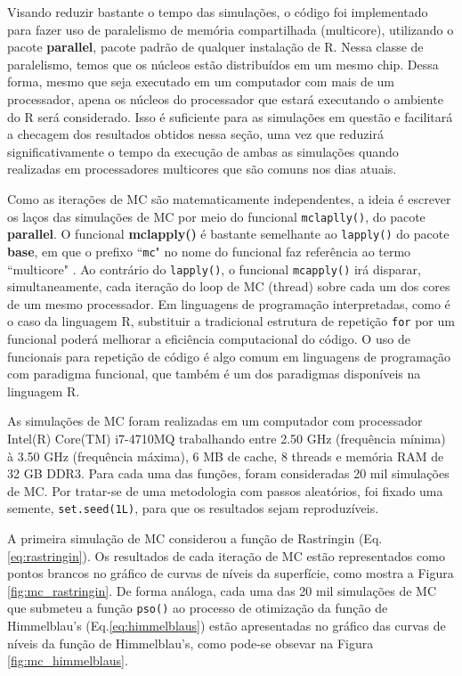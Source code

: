 \documentclass[10pt,letterpaper]{article}
\begin{document}
Visando reduzir bastante o tempo das simulações, o código foi implementado para fazer uso de paralelismo de memória compartilhada (multicore), utilizando o pacote \textbf{parallel}, pacote padrão de qualquer instalação de \textsc{R}. Nessa classe de paralelismo, temos que os núcleos estão distribuídos em um mesmo chip. Dessa forma, mesmo que seja executado em um computador com mais de um processador, apena os núcleos do processador que estará executando o ambiente do \textsc{R} será considerado. Isso é suficiente para as simulações em questão e facilitará a checagem dos resultados obtidos nessa seção, uma vez que reduzirá significativamente o tempo da execução de ambas as simulações quando realizadas em processadores multicores que são comuns nos dias atuais.
 
 
Como as iterações de MC são matematicamente independentes, a ideia é escrever os laços das simulações de MC por meio do funcional \texttt{mclaplly()}, do pacote \textbf{parallel}. O funcional \textbf{mclapply()} é bastante semelhante ao \texttt{lapply()} do pacote \textbf{base}, em que o prefixo ``\texttt{mc}" no nome do funcional faz referência ao termo ``multicore" . Ao contrário do \texttt{lapply()}, o funcional \texttt{mcapply()} irá disparar, simultaneamente, cada iteração do loop de MC (thread) sobre cada um dos cores de um mesmo processador.  Em linguagens de programação interpretadas, como é o caso da linguagem \textsc{R}, substituir a tradicional estrutura de repetição \texttt{for} por um funcional poderá melhorar a eficiência computacional do código. O uso de funcionais para repetição de código é algo comum em linguagens de programação com paradigma funcional, que também é um dos paradigmas disponíveis na linguagem \textsc{R}.


As simulações de MC foram realizadas em um computador com processador Intel(R) Core(TM) i7-4710MQ trabalhando entre 2.50 GHz (frequência mínima) à 3.50 GHz (frequência máxima), 6 MB de cache, 8 threads e memória RAM de 32 GB DDR3. Para cada uma das funções, foram consideradas 20 mil simulações de MC. Por tratar-se de uma metodologia com passos aleatórios, foi fixado uma semente, \texttt{set.seed(1L)}, para que os resultados sejam reproduzíveis. 

A primeira simulação de MC considerou a função de Rastringin (Eq. \ref{eq:rastringin}). Os resultados de cada iteração de MC estão representados como pontos brancos no gráfico de curvas de níveis da superfície, como mostra a Figura \ref{fig:mc_rastringin}. De forma análoga, cada uma das 20 mil simulações de MC que submeteu a função \texttt{pso()} ao processo de otimização da função de Himmelblau's (Eq.\ref{eq:himmelblaus}) estão apresentadas no gráfico das curvas de níveis da função de Himmelblau's, como pode-se obsevar na Figura \ref{fig:mc_himmelblaus}.
\end{document}
